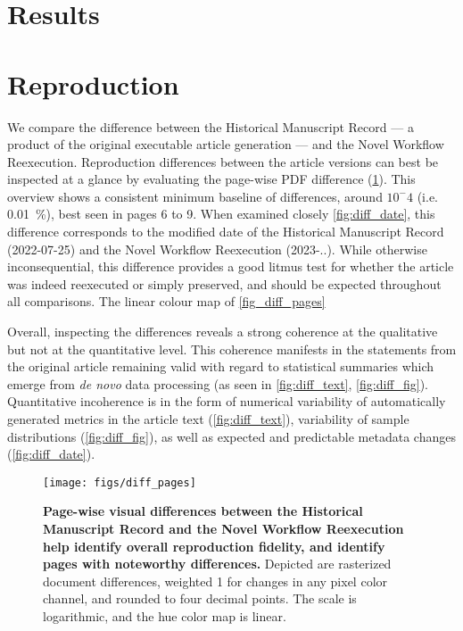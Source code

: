 \section{Results}

\section{Reproduction}

We compare the difference between the Historical Manuscript Record — a product of the original executable article generation — and the Novel Workflow Reexecution.
Reproduction differences between the article versions can best be inspected at a glance by evaluating the page-wise PDF difference (\ref{fig:diff_pages}).
This overview shows a consistent minimum baseline of differences, around $10^-4$ (i.e. \SI{0.01}{\percent}), best seen in pages 6 to 9.
When examined closely \ref{fig:diff_date}, this difference corresponds to the modified date of the Historical Manuscript Record (2022-07-25) and the Novel Workflow Reexecution (2023-..).
While otherwise inconsequential, this difference provides a good litmus test for whether the article was indeed reexecuted or simply preserved, and should be expected throughout all comparisons.
The linear colour map of \ref{fig_diff_pages}

Overall, inspecting the differences reveals a strong coherence at the qualitative but not at the quantitative level.
This coherence manifests in the statements from the original article remaining valid with regard to statistical summaries which emerge from  \textit{de novo} data processing (as seen in \ref{fig:diff_text}, \ref{fig:diff_fig}).
Quantitative incoherence is in the form of numerical variability of automatically generated metrics in the article text (\ref{fig:diff_text}), variability of sample distributions (\ref{fig:diff_fig}), as well as expected and predictable metadata changes (\ref{fig:diff_date}).


\begin{figure}
	\centering
	\texttt{[image: figs/diff\_pages]}
	\caption{
		\textbf{Page-wise visual differences between the Historical Manuscript Record and the Novel Workflow Reexecution help identify overall reproduction fidelity, and identify pages with noteworthy differences.}
		Depicted are rasterized document differences, weighted 1 for changes in any pixel color channel, and rounded to four decimal points.
		The scale is logarithmic, and the hue color map is linear.
	}
	\label{fig:diff_pages}
\end{figure}

